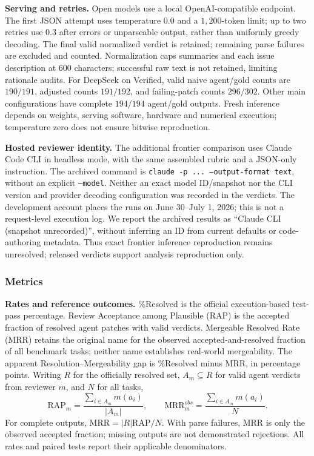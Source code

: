 \documentclass[10pt,conference]{IEEEtran}
\begin{document}
\textbf{Serving and retries.} Open models use a local OpenAI-compatible endpoint.
The first JSON attempt uses temperature $0.0$ and a $1{,}200$-token limit; up to two
retries use $0.3$ after errors or unparseable output, rather than uniformly greedy decoding.
The final valid normalized verdict is retained; remaining parse failures are excluded
and counted. Normalization caps summaries and each issue description at $600$ characters;
successful raw text is not retained, limiting rationale audits. For DeepSeek on Verified,
valid naive agent/gold counts are $190/191$, adjusted counts $191/192$, and failing-patch
counts $296/302$. Other main configurations have complete $194/194$ agent/gold outputs.
Fresh inference depends on weights, serving software, hardware and numerical execution;
temperature zero does not ensure bitwise reproduction.

\textbf{Hosted reviewer identity.} The additional frontier comparison uses Claude Code CLI
in headless mode, with the same assembled rubric and a JSON-only instruction. The archived
command is \texttt{claude -p ... --output-format text}, without an explicit
\texttt{--model}. Neither an exact model ID/snapshot nor the CLI version and provider
decoding configuration was recorded in the verdicts. The development account places the
runs on June 30--July 1, 2026; this is not a request-level execution log. We report the
archived results as ``Claude CLI (snapshot unrecorded)'', without inferring an ID from
current defaults or code-authoring metadata. Thus exact frontier inference reproduction
remains unresolved; released verdicts support analysis reproduction only.

\subsubsection{Metrics}

\textbf{Rates and reference outcomes.} \%Resolved is the official execution-based test-pass
percentage. Review Acceptance among Plausible (RAP) is the accepted fraction of resolved
agent patches with valid verdicts. Mergeable Resolved Rate (MRR) retains the original name
for the observed accepted-and-resolved fraction of all benchmark tasks; neither name
establishes real-world mergeability. The apparent Resolution--Mergeability gap is
\%Resolved minus MRR, in percentage points.
Writing $R$ for the officially resolved set, $A_m\subseteq R$ for valid agent verdicts from
reviewer $m$, and $N$ for all tasks,
\[
 \mathrm{RAP}_m=\frac{\sum_{i\in A_m}m(a_i)}{|A_m|},\qquad
 \mathrm{MRR}^{obs}_m=\frac{\sum_{i\in A_m}m(a_i)}{N}.
\]
For complete outputs, $\mathrm{MRR}=|R|\mathrm{RAP}/N$. With parse failures, MRR is only
the observed accepted fraction; missing outputs are not demonstrated rejections. All rates
and paired tests report their applicable denominators.
\end{document}
